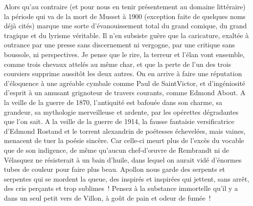 \documentclass[french,twoside]{book} %
\begin{document}
Alors qu’au contraire (et pour nous en tenir présentement au domaine littéraire) la période qui va de la mort de Musset à 1900 (exception faite de quelques noms déjà cités) marque une sorte d’évanouissement total du grand comique, du grand tragique et du lyrisme véritable. Il n’en subsiste guère que la caricature, exaltée à outrance par une presse sans discernement ni vergogne, par une critique sans boussole, ni perspectives. Je pense que le rire, la terreur et l’élan vont ensemble, comme trois chevaux attelés au même char, et que la perte de l’un des trois coursiers supprime aussitôt les deux autres. On en arrive à faire une réputation d’éloquence à une agréable cymbale comme Paul de SaintVictor, et d’ingéniosité d’esprit à un amusant grignoteur de travers courants, comme Edmond About. A la veille de la guerre de 1870, l’antiquité est bafouée dans son charme, sa grandeur, sa mythologie merveilleuse et ardente, par les opérettes dégradantes que l’on sait. A la veille de la guerre de 1914, la fausse fantaisie versificatrice d’Edmond Rostand et le torrent alexandrin de poétesses échevelées, mais vaines, menacent de tuer la poésie sincère. Car celle-ci meurt plus de l’excès du vocable que de son indigence, de même qu’aucun chef-d’œuvre de Rembrandt ni de Vélasquez ne résisterait à un bain d’huile, dans lequel on aurait vidé d’énormes tubes de couleur pour faire plus beau. Apollon nous garde des serpents et serpentes qui se mordent la queue, des inspirés et inspirées qui jettent, sans arrêt, des cris perçants et trop sublimes ! Pensez à la substance immortelle qu’il y a dans un seul petit vers de Villon, à goût de pain et odeur de fumée !\par
\end{document}
